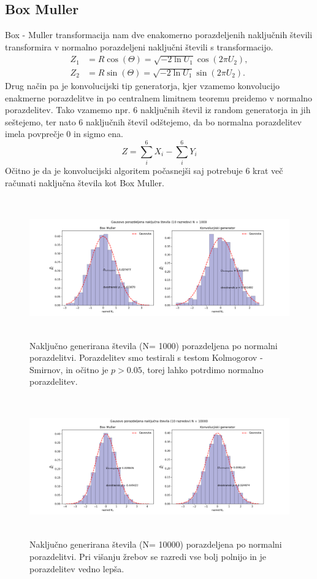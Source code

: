 \documentclass[11pt, a4paper]{article}
\begin{document}
\subsection{Box Muller}
Box - Muller transformacija nam dve enakomerno porazdeljenih naključnih števili transformira v normalno porazdeljeni naključni števili s transformacijo.
\begin{equation}
\begin{split}
Z_1 &=R \cos(\Theta) =\sqrt{-2 \ln U_1} \cos(2 \pi U_2), \\
Z_2 &= R \sin(\Theta) = \sqrt{-2 \ln U_1} \sin(2 \pi U_2).
\end{split}
\end{equation}
Drug način pa je konvolucijski tip generatorja, kjer vzamemo konvolucijo enakmerne porazdelitve in po centralnem limitnem teoremu preidemo v normalno porazdelitev. Tako vzamemo npr. 6 naključnih števil iz random generatorja in jih seštejemo, ter nato 6 naključnih števil odštejemo, da bo normalna porazdelitev imela povprečje 0 in sigmo ena.
\begin{equation}
Z = \sum_i^6 X_i - \sum_i^6 Y_i
\end{equation}
Očitno je da je konvolucijski algoritem počasnejši saj potrebuje 6 krat več računati naključna števila kot Box Muller.
\begin{figure}[H]
\hspace*{-2.5cm}  
  \includegraphics[width=22cm, height =6cm]{normalna_1.png}
 \caption{Naključno generirana števila (N= 1000) porazdeljena po normalni porazdelitvi. Porazdelitev smo testirali s testom Kolmogorov - Smirnov, in očitno je $p > 0.05$, torej lahko potrdimo normalno porazdelitev.  }
\end{figure}
\begin{figure}[H]
\hspace*{-2.5cm}  
  \includegraphics[width=22cm, height =6cm]{normalna_2.png}
 \caption{Naključno generirana števila (N= 10000) porazdeljena po normalni porazdelitvi. Pri višanju žrebov se razredi vse bolj polnijo in je porazdelitev vedno lepša. }
\end{figure}
\end{document}
